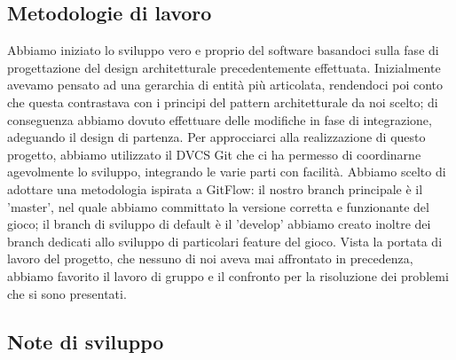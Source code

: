 \documentclass{article}
\begin{document}
\subsection{Metodologie di lavoro}
Abbiamo iniziato lo sviluppo vero e proprio del software basandoci sulla fase di progettazione del design architetturale precedentemente effettuata. Inizialmente avevamo pensato ad una gerarchia di entità più articolata, rendendoci poi conto che questa contrastava con i principi del pattern architetturale da noi scelto; di conseguenza abbiamo dovuto effettuare delle modifiche in fase di integrazione, adeguando il design di partenza.
Per approcciarci alla realizzazione di questo progetto, abbiamo utilizzato il DVCS Git che ci ha permesso di coordinarne agevolmente lo sviluppo, integrando le varie parti con facilità. Abbiamo scelto di adottare una metodologia ispirata a GitFlow: il nostro branch principale è il 'master', nel quale abbiamo committato la versione corretta e funzionante del gioco; il branch di sviluppo di default è il 'develop' abbiamo creato inoltre dei branch dedicati allo sviluppo di particolari feature del gioco. 
Vista la portata di lavoro del progetto, che nessuno di noi aveva mai affrontato in precedenza, abbiamo favorito il lavoro di gruppo e il confronto per la risoluzione dei problemi che si sono presentati.
\subsection{Note di sviluppo}
\end{document}
